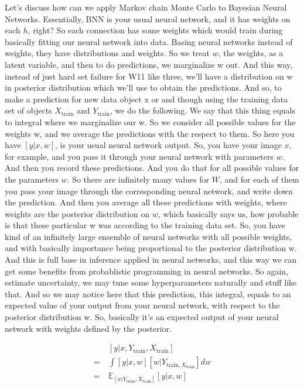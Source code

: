 \documentclass[11pt, oneside, reqno]{amsart}
\numberwithin{equation}{section}
\theoremstyle{plain}%
\theoremstyle{definition}
\theoremstyle{remark}
\newcommand{\E}{\mathbb{E}}
\begin{document}
Let's discuss how can we apply Markov chain Monte Carlo to Bayesian Neural Networks. Essentially, BNN  is your usual neural network, and it has weights on each $h$, right? So each connection has some weights which would train during basically fitting our neural network into data. Basing neural networks instead of weights, they have distributions and weights. So we treat $w$, the weights, as a latent variable, and then to do predictions, we marginalize w out. And this way, instead of just hard set failure for W11 like three, we'll have a distribution on w in posterior distribution which we'll use to obtain the predictions. And so, to make a prediction for new data object x or and though using the training data set of objects $X_\text{train}$ and $Y_\text{train}$, we do the following. We say that this thing equals to integral where we marginalize our w. So we consider all possible values for the weights w, and we average the predictions with the respect to them. So here you have $[y|x,w]$, is your usual neural network output. So, you have your image $x$, for example, and you pass it through your neural network with parameters $w$. And then you record these predictions. And you do that for all possible values for the parameters $w$. So there are infinitely many values for $W$, and for each of them you pass your image through the corresponding neural network, and write down the prediction. And then you average all these predictions with weights, where weights are the posterior distribution on $w$, which basically says us, how probable is that these particular w was according to the training data set. So, you have kind of an infinitely large ensemble of neural networks with all possible weights, and with basically importance being proportional to the posterior distribution w. And this is full base in inference applied in neural networks, and this way we can get some benefits from probablistic programming in neural networks. So again, estimate uncertainty, we may tune some hyperparameters naturally and stuff like that. And so we may notice here that this prediction, this integral, equals to an expected value of your output from your neural network, with respect to the posterior distribution w. So, basically it's an expected output of your neural network with weights defined by the posterior.

\begin{align*}
&\	[y|x,Y_{\text{train}},X_{\text{train}}]\\
= &\ \int [y|x,w] [w|Y_{\text{train},X_{\text{train}}}]dw\\
= &\ \E_{[w|Y_{\text{train}},X_{\text{train}}]} [y|x,w]
\end{align*}
\end{document}
